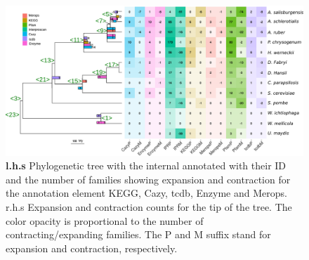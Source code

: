 \documentclass[jof,article,submit,moreauthors,pdftex,10pt,a4paper]{Definitions/mdpi}
\begin{document}
\begin{figure}[htbp]
    \centering
    \includegraphics[width=0.9\linewidth]{cafeFinal.pdf}
    \caption{\label{fig:cafe} \textbf{l.h.s} Phylogenetic tree with the internal annotated with their ID and the number of families showing expansion and contraction for the annotation element KEGG, Cazy, tcdb, Enzyme and Merops. {r.h.s} Expansion and contraction counts for the tip of the tree. The color opacity is proportional to the number of contracting/expanding families. The P and M suffix stand for expansion and contraction, respectively.}
\end{figure}
\end{document}
